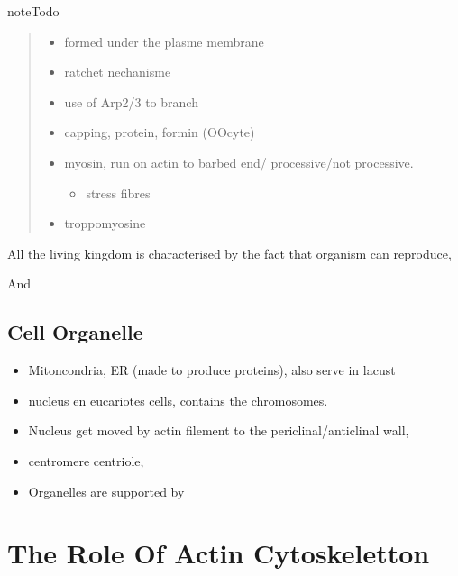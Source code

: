 \documentclass[A4paperpaper,11pt,english]{sphinxmanual}
\begin{document}
\begin{notice}{note}{Todo}
\begin{quote}
\begin{itemize}
\item {} 
formed under the plasme membrane

\item {} 
ratchet nechanisme

\item {} 
use of Arp2/3 to branch

\item {} 
capping, protein,  formin (OOcyte)

\item {} 
myosin, run on actin to barbed end/ processive/not processive.
\begin{itemize}
\item {} 
stress fibres

\end{itemize}

\item {} 
troppomyosine

\end{itemize}
\end{quote}

All the living kingdom is characterised by the fact that organism can reproduce,
\end{notice}

And


\subsection{Cell Organelle}
\label{parts/part1:cell-organelle}\begin{itemize}
\item {} 
Mitoncondria, ER (made to produce proteins), also serve in lacust

\item {} 
nucleus en eucariotes cells, contains the chromosomes.

\item {} 
Nucleus get moved by actin filement to the periclinal/anticlinal wall,

\item {} 
centromere centriole,

\item {} 
Organelles are supported by

\end{itemize}


\section{The Role Of Actin Cytoskeletton}
\label{parts/part1:the-role-of-actin-cytoskeletton}
\end{document}
